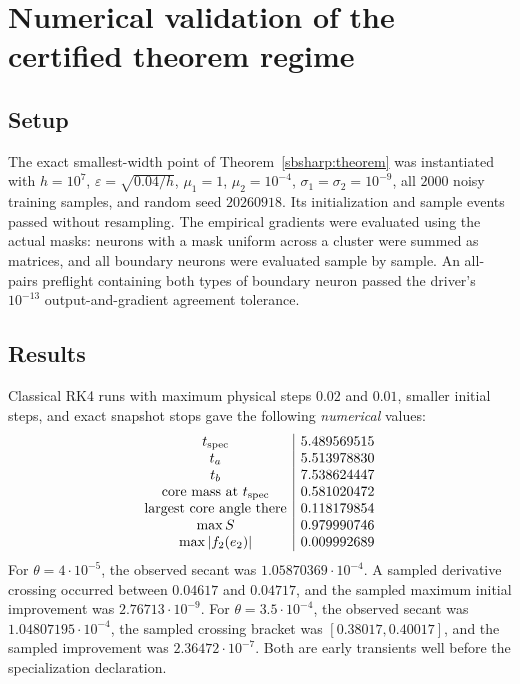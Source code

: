 \documentclass[10pt]{article}
\theoremstyle{remark}\newtheorem{remark}[theorem]{Remark}
\begin{document}
\section{Numerical validation of the certified theorem regime}\label{app:validation}

\subsection{Setup}
The exact smallest-width
point of Theorem~\ref{sbsharp:theorem} was instantiated with $h=10^7$,
$\varepsilon=\sqrt{0.04/h}$, $\mu_1=1$, $\mu_2=10^{-4}$,
$\sigma_1=\sigma_2=10^{-9}$, all $2000$ noisy training samples,
and random seed $20260918$. Its initialization and sample events passed
without resampling. The empirical gradients were evaluated using the
actual masks: neurons with a mask uniform across a cluster were summed
as matrices, and all boundary neurons were evaluated sample by sample.
An all-pairs preflight containing both types of boundary neuron passed
the driver's $10^{-13}$ output-and-gradient agreement tolerance.

\subsection{Results}
Classical RK4 runs with maximum physical steps $0.02$ and $0.01$,
smaller initial steps, and exact snapshot stops gave the following
\emph{numerical} values:
\[
\begin{array}{c|r}
 t_{\rm spec}&5.489569515\\
 t_a&5.513978830\\
 t_b&7.538624447\\
 \text{core mass at }t_{\rm spec}&0.581020472\\
 \text{largest core angle there}&0.118179854\\
 \max S&0.979990746\\
 \max |f_2(e_2)|&0.009992689
\end{array}
\]
For $\theta=4\cdot10^{-5}$, the observed secant was
$1.05870369\cdot10^{-4}$. A sampled derivative crossing occurred between
$0.04617$ and $0.04717$, and the sampled maximum initial improvement was
$2.76713\cdot10^{-9}$.
For $\theta=3.5\cdot10^{-4}$, the observed secant was
$1.04807195\cdot10^{-4}$, the sampled crossing bracket was
$[0.38017,0.40017]$, and the sampled improvement was
$2.36472\cdot10^{-7}$. Both are early transients well before the
specialization declaration.
\end{document}
